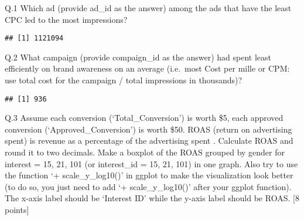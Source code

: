 \documentclass[]{article}
\newenvironment{Shaded}{\begin{snugshade}}{\end{snugshade}}
\newcommand{\KeywordTok}[1]{\textcolor[rgb]{0.13,0.29,0.53}{\textbf{#1}}}
\newcommand{\DecValTok}[1]{\textcolor[rgb]{0.00,0.00,0.81}{#1}}
\newcommand{\StringTok}[1]{\textcolor[rgb]{0.31,0.60,0.02}{#1}}
\newcommand{\OperatorTok}[1]{\textcolor[rgb]{0.81,0.36,0.00}{\textbf{#1}}}
\newcommand{\NormalTok}[1]{#1}
\begin{document}
Q.1 Which ad (provide ad\_id as the answer) among the ads that have the
least CPC led to the most impressions?

\begin{Shaded}
\end{Shaded}

\begin{verbatim}
## [1] 1121094
\end{verbatim}

Q.2 What campaign (provide compaign\_id as the answer) had spent least
efficiently on brand awareness on an average (i.e.~most Cost per mille
or CPM: use total cost for the campaign / total impressions in
thousands)?

\begin{Shaded}
\end{Shaded}

\begin{verbatim}
## [1] 936
\end{verbatim}

Q.3 Assume each conversion (`Total\_Conversion') is worth \$5, each
approved conversion (`Approved\_Conversion') is worth \$50. ROAS (return
on advertising spent) is revenue as a percentage of the advertising
spent . Calculate ROAS and round it to two decimals. Make a boxplot of
the ROAS grouped by gender for interest = 15, 21, 101 (or interest\_id =
15, 21, 101) in one graph. Also try to use the function `+
scale\_y\_log10()' in ggplot to make the visualization look better (to
do so, you just need to add `+ scale\_y\_log10()' after your ggplot
function). The x-axis label should be `Interest ID' while the y-axis
label should be ROAS. {[}8 points{]}
\end{document}
